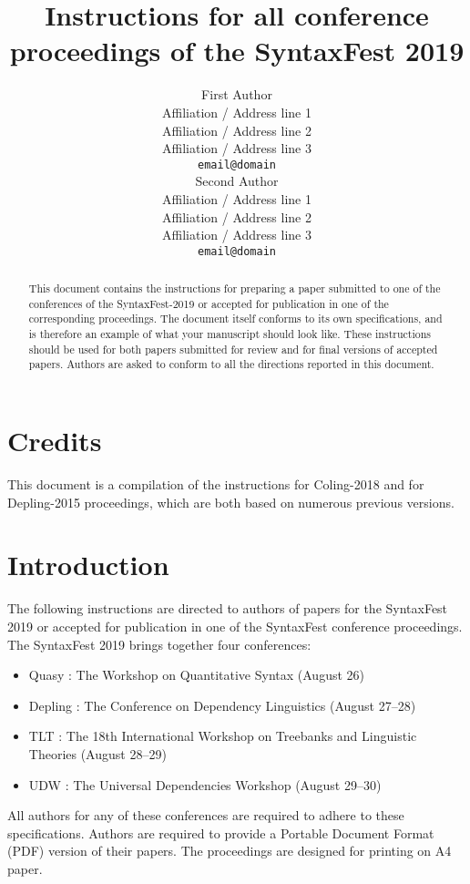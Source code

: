 \documentclass[11pt]{article}
\title{Instructions for all conference proceedings of the SyntaxFest 2019}
\author{First Author \\
  Affiliation / Address line 1 \\
  Affiliation / Address line 2 \\
  Affiliation / Address line 3 \\
  {\tt email@domain} \\\And
  Second Author \\
  Affiliation / Address line 1 \\
  Affiliation / Address line 2 \\
  Affiliation / Address line 3 \\
  {\tt email@domain} \\}
\date{}
\begin{document}
\maketitle
\begin{abstract}
This document contains the instructions for preparing a paper submitted to one of the conferences of the SyntaxFest-2019 or accepted for publication in one of the corresponding proceedings. The document itself conforms to its own specifications, and is therefore an example of what your manuscript should look like. These instructions should be used for both papers submitted for review and for final versions of accepted papers. Authors are asked to conform to all the directions reported in this document.
\end{abstract}



\section{Credits}

This document is a compilation of the instructions for Coling-2018 and for Depling-2015 proceedings, which are both based on numerous previous versions.



\section{Introduction}
\label{intro}

The following instructions are directed to authors of papers for the SyntaxFest 2019 or accepted for publication in one of the SyntaxFest conference proceedings. The SyntaxFest 2019 brings together four conferences: 
\begin{itemize}[label={\large\textbullet}]
\setlength{\itemsep}{0pt}
\setlength{\parsep}{0pt}
\setlength{\parskip}{0pt}
\item Quasy : The Workshop on Quantitative Syntax (August 26)
\item Depling : The Conference on Dependency Linguistics (August 27--28)
\item TLT : The 18th International Workshop on Treebanks and Linguistic Theories (August 28--29)
\item UDW : The Universal Dependencies Workshop (August 29--30)
\end{itemize}
All authors for any of these conferences are required to adhere to these specifications. Authors are required to provide a Portable Document Format (PDF) version of their papers. The proceedings are designed for printing on A4 paper.
\end{document}
